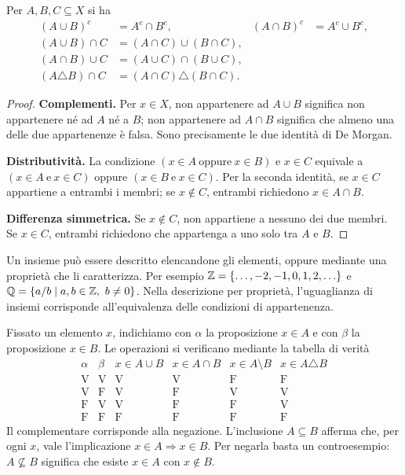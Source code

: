 \begin{proposizione}
Per $A,B,C\subseteq X$ si ha
\[
\begin{aligned}
(A\cup B)^c&=A^c\cap B^c,&(A\cap B)^c&=A^c\cup B^c,\\
(A\cup B)\cap C&=(A\cap C)\cup(B\cap C),\\
(A\cap B)\cup C&=(A\cup C)\cap(B\cup C),\\
(A\triangle B)\cap C&=(A\cap C)\triangle(B\cap C).
\end{aligned}
\]
\end{proposizione}
\begin{proof}
\textbf{Complementi.} Per $x\in X$, non appartenere ad $A\cup B$ significa non appartenere né ad $A$ né a $B$; non appartenere ad $A\cap B$ significa che almeno una delle due appartenenze è falsa. Sono precisamente le due identità di De Morgan.

\textbf{Distributività.} La condizione $(x\in A\ \text{oppure}\ x\in B)$ e $x\in C$ equivale a $(x\in A\ \text{e}\ x\in C)$ oppure $(x\in B\ \text{e}\ x\in C)$. Per la seconda identità, se $x\in C$ appartiene a entrambi i membri; se $x\notin C$, entrambi richiedono $x\in A\cap B$.

\textbf{Differenza simmetrica.} Se $x\notin C$, non appartiene a nessuno dei due membri. Se $x\in C$, entrambi richiedono che appartenga a uno solo tra $A$ e $B$.
\end{proof}

Un insieme può essere descritto elencandone gli elementi, oppure mediante una proprietà che li caratterizza. Per esempio $\mathbb{Z}=\{\ldots,-2,-1,0,1,2,\ldots\}$ e $\mathbb{Q}=\{a/b\mid a,b\in\mathbb{Z},\ b\ne0\}$. Nella descrizione per proprietà, l'uguaglianza di insiemi corrisponde all'equivalenza delle condizioni di appartenenza.

Fissato un elemento $x$, indichiamo con $\alpha$ la proposizione $x\in A$ e con $\beta$ la proposizione $x\in B$. Le operazioni si verificano mediante la tabella di verità
\[
\begin{array}{cc|cccc}
\alpha&\beta&x\in A\cup B&x\in A\cap B&x\in A\setminus B&x\in A\triangle B\\\hline
\mathrm V&\mathrm V&\mathrm V&\mathrm V&\mathrm F&\mathrm F\\
\mathrm V&\mathrm F&\mathrm V&\mathrm F&\mathrm V&\mathrm V\\
\mathrm F&\mathrm V&\mathrm V&\mathrm F&\mathrm F&\mathrm V\\
\mathrm F&\mathrm F&\mathrm F&\mathrm F&\mathrm F&\mathrm F
\end{array}
\]
Il complementare corrisponde alla negazione. L'inclusione $A\subseteq B$ afferma che, per ogni $x$, vale l'implicazione $x\in A\Rightarrow x\in B$. Per negarla basta un controesempio: $A\nsubseteq B$ significa che esiste $x\in A$ con $x\notin B$.

